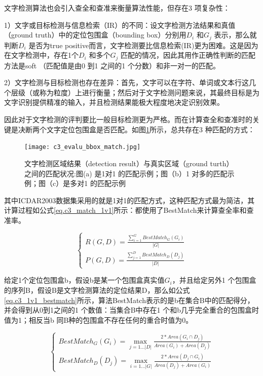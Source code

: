         文字检测算法也会引入查全和查准来衡量算法性能，但存在3 项复杂性：

        1）文字或目标检测与信息检索（IR）的不同：设文字检测方法结果和真值（ground truth）中的定位包围盒（bounding box）分别用$D_i$ 和$G_j$ 表示，那么就判断$D_i$ 是否为true positive而言，文字检测要比信息检索(IR)更为困难。这是因为在文字检测中，存在1个$D_i$ 和多个$G_j$ 匹配的情况，因此其用作正确性判断的匹配方法是soft （匹配值是由0 到1 之间的1 个分数）和非一对一的匹配。

        2）文字检测与目标检测也存在差异：首先，文字可以在字符、单词或文本行这几个层级（或称为粒度）上进行衡量；然后对于文字检测问题来说，其最终目标是为文字识别提供精准的输入，并且检测结果能极大程度地决定识别效果。

        因此对于文字检测的评判要比一般目标检测更为严格。而在计算查全和查准时的关键是决断两个文字定位包围盒是否匹配。如图\ref{fig.c3_evalu_bbox_match}所示，总共存在3 种匹配的方式：

        \begin{figure}[!h]
        \centering
        \texttt{[image: c3\_evalu\_bbox\_match.jpg]} \caption{文字检测区域结果（detection result）与真实区域（ground turth）之间的匹配状况:图(a) 是1对1 的匹配示例；图（b）1 对多的匹配示例；图（c）是多对1 的匹配示例}
        \label{fig.c3_evalu_bbox_match}
        \end{figure}

        其中ICDAR2003数据集采用的就是1对1的匹配方式\cite{Mariano2002Performance}，这种匹配方式最为简洁，其计算过程如公式\ref{eq.c3_match_1v1}所示：都使用了BestMatch来计算查全率和查准率。

        \begin{equation}
        \left\{
        \begin{array}{c}
        R(G,D)=\frac{\sum_{i=1}^GBestMatch_G(G_i)}{|G|}\\
        P(G,D)=\frac{\sum_{j=1}^DBestMatch_D(D_j)}{|D|}
        \end{array}
        \right.
        \label{eq.c3_match_1v1}
        \end{equation}

        给定1个定位包围盒b，假设b是某一个包围盒真实值$G_i$，并且给定另外1 个包围盒的序列B，假设B是文字检测算法的定位结果D，那么如公式\ref{eq.c3_1v1_bestmatch}所示，算法BestMatch表示的是b在集合B中的匹配得分，并会得到从0到1之间的1 个数值：当集合B中存在1 个和b几乎完全重合的包围盒时值为1；相反当b 同B种的包围盒不存在任何的重合时值为0。

        \begin{equation}
        \left\{
        \begin{array}{c}
        BestMatch_G(G_i)=\max_{j=1...|D|} \frac{2*Area(G_i \cap D_j)}{Area(G_i)+Area(D_j)}\\
        BestMatch_D(D_j)=\max_{i=1...|G|} \frac{2*Area(D_j \cap G_i)}{Area(D_j)+Area(G_i)}
        \end{array}
        \right.
        \label{eq.c3_1v1_bestmatch}
        \end{equation}

